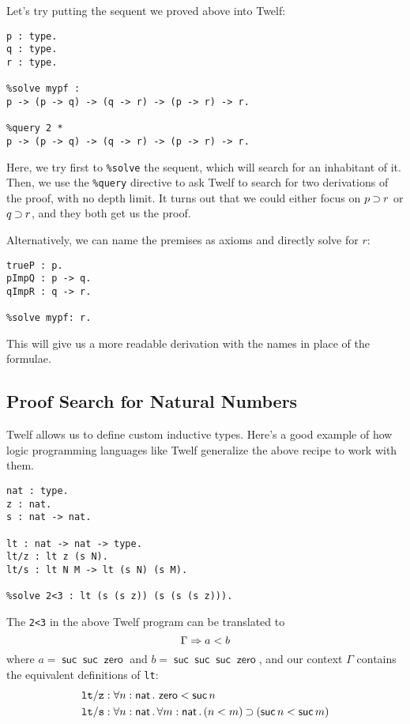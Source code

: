 \documentclass{article}
\newcommand*{\nat}{\operatorname{\textsf{nat}}}
\newcommand*{\s}{\operatorname{\textsf{suc}}}
\newcommand*{\z}{\operatorname{\textsf{zero}}}
\begin{document}
Let's try putting the sequent we proved above into Twelf:
\begin{verbatim}
p : type.
q : type.
r : type.

%solve mypf :
p -> (p -> q) -> (q -> r) -> (p -> r) -> r.

%query 2 *
p -> (p -> q) -> (q -> r) -> (p -> r) -> r.
\end{verbatim}

Here, we try first to \texttt{\%solve} the sequent, which will search for an inhabitant of it.
Then, we use the \texttt{\%query} directive to ask Twelf to search for two derivations of the
proof, with no depth limit.  It turns out that we could either focus on \(p \mathbin{\supset} r\) or
\(q \mathbin{\supset} r\), and they both get us the proof.

Alternatively, we can name the premises as axioms and directly solve for \(r\):
\begin{verbatim}
trueP : p.
pImpQ : p -> q.
qImpR : q -> r.

%solve mypf: r.
\end{verbatim}
This will give us a more readable derivation with the names in place of the formulae.

\subsection{Proof Search for Natural Numbers}

Twelf allows us to define custom inductive types.  Here's a good example of how logic
programming languages like Twelf generalize the above recipe to work with them.

\begin{verbatim}
nat : type.
z : nat.
s : nat -> nat.

lt : nat -> nat -> type.
lt/z : lt z (s N).
lt/s : lt N M -> lt (s N) (s M).

%solve 2<3 : lt (s (s z)) (s (s (s z))).
\end{verbatim}

The \texttt{2<3} in the above Twelf program can be translated to
\[
  \Gamma \Rightarrow a < b
\]
where \(a = \s \s \z\) and \(b = \s \s \s \z\), and our context \(\Gamma\) contains the
equivalent definitions of \texttt{lt}:
\begin{align*}
  \mathtt{lt/z} &: \forall n : \nat. \, \z < \s n \\
  \mathtt{lt/s} &: \forall n : \nat. \, \forall m : \nat. \, (n < m) \imp (\s n < \s m)
\end{align*}
\end{document}
